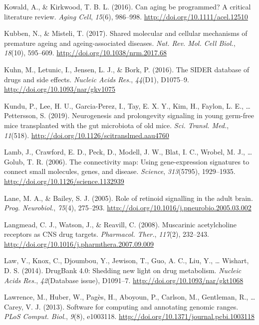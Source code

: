 \documentclass[12pt,twoside]{unicam}
\begin{document}
\begin{cslreferences}
\leavevmode\hypertarget{ref-Kowald2016}{}%
Kowald, A., \& Kirkwood, T. B. L. (2016). Can aging be programmed? A critical literature review. \emph{Aging Cell}, \emph{15}(6), 986--998. \url{http://doi.org/10.1111/acel.12510}

\leavevmode\hypertarget{ref-Kubben2017}{}%
Kubben, N., \& Misteli, T. (2017). Shared molecular and cellular mechanisms of premature ageing and ageing-associated diseases. \emph{Nat. Rev. Mol. Cell Biol.}, \emph{18}(10), 595--609. \url{http://doi.org/10.1038/nrm.2017.68}

\leavevmode\hypertarget{ref-Kuhn2016}{}%
Kuhn, M., Letunic, I., Jensen, L. J., \& Bork, P. (2016). The SIDER database of drugs and side effects. \emph{Nucleic Acids Res.}, \emph{44}(D1), D1075--9. \url{http://doi.org/10.1093/nar/gkv1075}

\leavevmode\hypertarget{ref-Kundu2019}{}%
Kundu, P., Lee, H. U., Garcia-Perez, I., Tay, E. X. Y., Kim, H., Faylon, L. E., \ldots{} Pettersson, S. (2019). Neurogenesis and prolongevity signaling in young germ-free mice transplanted with the gut microbiota of old mice. \emph{Sci. Transl. Med.}, \emph{11}(518). \url{http://doi.org/10.1126/scitranslmed.aau4760}

\leavevmode\hypertarget{ref-Lamb2006}{}%
Lamb, J., Crawford, E. D., Peck, D., Modell, J. W., Blat, I. C., Wrobel, M. J., \ldots{} Golub, T. R. (2006). The connectivity map: Using gene-expression signatures to connect small molecules, genes, and disease. \emph{Science}, \emph{313}(5795), 1929--1935. \url{http://doi.org/10.1126/science.1132939}

\leavevmode\hypertarget{ref-Lane2005}{}%
Lane, M. A., \& Bailey, S. J. (2005). Role of retinoid signalling in the adult brain. \emph{Prog. Neurobiol.}, \emph{75}(4), 275--293. \url{http://doi.org/10.1016/j.pneurobio.2005.03.002}

\leavevmode\hypertarget{ref-Langmead2008}{}%
Langmead, C. J., Watson, J., \& Reavill, C. (2008). Muscarinic acetylcholine receptors as CNS drug targets. \emph{Pharmacol. Ther.}, \emph{117}(2), 232--243. \url{http://doi.org/10.1016/j.pharmthera.2007.09.009}

\leavevmode\hypertarget{ref-Law2014}{}%
Law, V., Knox, C., Djoumbou, Y., Jewison, T., Guo, A. C., Liu, Y., \ldots{} Wishart, D. S. (2014). DrugBank 4.0: Shedding new light on drug metabolism. \emph{Nucleic Acids Res.}, \emph{42}(Database issue), D1091--7. \url{http://doi.org/10.1093/nar/gkt1068}

\leavevmode\hypertarget{ref-Lawrence2013}{}%
Lawrence, M., Huber, W., Pagès, H., Aboyoun, P., Carlson, M., Gentleman, R., \ldots{} Carey, V. J. (2013). Software for computing and annotating genomic ranges. \emph{PLoS Comput. Biol.}, \emph{9}(8), e1003118. \url{http://doi.org/10.1371/journal.pcbi.1003118}


\end{cslreferences}
\end{document}
